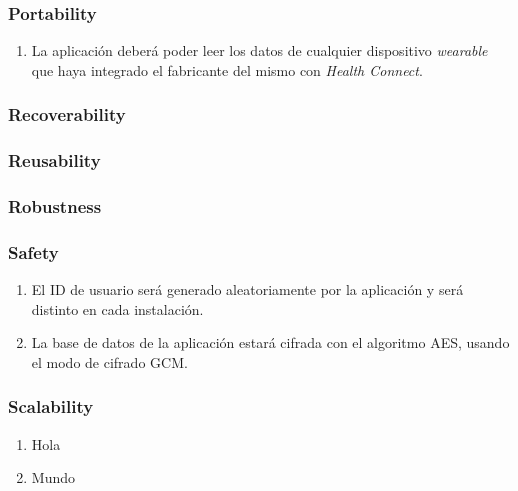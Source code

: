         \subsubsection{Portability}
            \begin{enumerate}[resume, label=\textbf{\texttt{RNF-\arabic*}}]
                \item La aplicación deberá poder leer los datos de cualquier dispositivo \textit{wearable} que haya integrado el fabricante del mismo con \textit{Health Connect}.
            \end{enumerate}
        \subsubsection{Recoverability}
        \subsubsection{Reusability}
        \subsubsection{Robustness}
        \subsubsection{Safety}
            \begin{enumerate}[resume, label=\textbf{\texttt{RNF-\arabic*}}]
                \item El ID de usuario será generado aleatoriamente por la aplicación y será distinto en cada instalación.
                \item La base de datos de la aplicación estará cifrada con el algoritmo AES, usando el modo de cifrado GCM.
            \end{enumerate}
        \subsubsection{Scalability}
            \begin{enumerate}[resume, label=\textbf{\texttt{RNF-\arabic*}}]
                \item Hola
                \item Mundo
            \end{enumerate}
